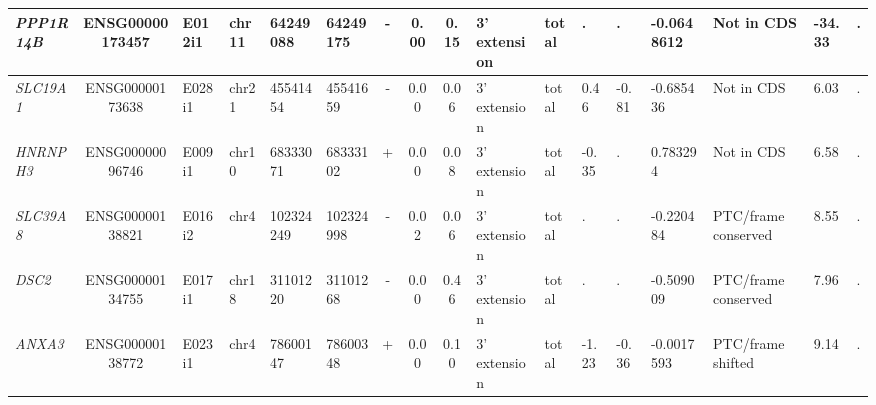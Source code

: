 \begin{appendices}
\begin{landscape}
\begin{table}
{\begin{tabular}{|l|c|l|l|l|l|c|c|c|l|l|l|l|l|l|l|l|}
		\textit{PPP1R14B} & ENSG00000173457 & E012i1 & chr11 & 64249088 & 64249175 & -     & 0.00  & 0.15  & 3' extension & total & . & . & -0.0648612 & Not in CDS     & -34.33 & . \\ \hline
		\textit{SLC19A1} & ENSG00000173638 & E028i1 & chr21 & 45541454 & 45541659 & -     & 0.00  & 0.06  & 3' extension & total & 0.46  & -0.81 & -0.685436 & Not in CDS     & 6.03  & . \\ \hline
		\textit{HNRNPH3} & ENSG00000096746 & E009i1 & chr10 & 68333071 & 68333102 & +     & 0.00  & 0.08  & 3' extension & total & -0.35 & . & 0.783294 & Not in CDS     & 6.58  & . \\ \hline
		\textit{SLC39A8} & ENSG00000138821 & E016i2 & chr4  & 102324249 & 102324998 & -     & 0.02  & 0.06  & 3' extension & total & . & . & -0.220484 & PTC/frame conserved & 8.55  & . \\ \hline
		\textit{DSC2} & ENSG00000134755 & E017i1 & chr18 & 31101220 & 31101268 & -     & 0.00  & 0.46  & 3' extension & total & . & . & -0.509009 & PTC/frame conserved & 7.96  & . \\ \hline
		\textit{ANXA3} & ENSG00000138772 & E023i1 & chr4  & 78600147 & 78600348 & +     & 0.00  & 0.10  & 3' extension & total & -1.23 & -0.36 & -0.0017593 & PTC/frame shifted & 9.14  & . \\ \hline
	\end{tabular}%
	} 
\end{table}%

\end{landscape}

\addtolength{\abovecaptionskip}{25mm}

\clearpage



\end{appendices}
